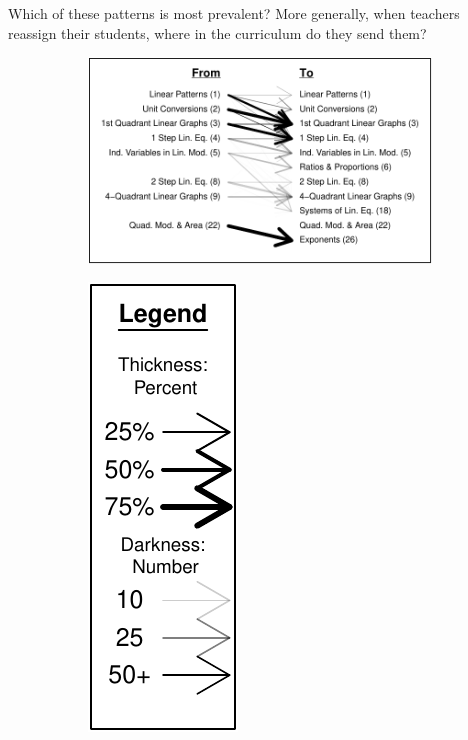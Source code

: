 \documentclass[notitlepage,12pt]{jedm}\usepackage[]{graphicx}\usepackage[]{color}
\makeatletter
\def\maxwidth{ %
  \ifdim\Gin@nat@width>\linewidth
    \linewidth
  \else
    \Gin@nat@width
  \fi
}
\makeatother
\begin{document}
Which of these patterns is most prevalent?
More generally, when teachers reassign their students, where in the
curriculum do they send them?







\begin{figure}
  \centering
  \begin{subfigure}{5in}

\includegraphics[width=\maxwidth]{figure/transition1-1} 

\end{subfigure}
\begin{subfigure}{1in}
  \centering

\includegraphics[width=\maxwidth]{figure/trans1legend-1} 


\end{subfigure}
\end{figure}
\end{document}
